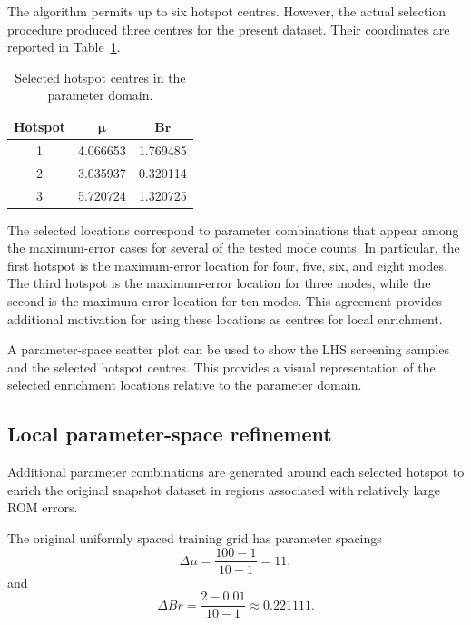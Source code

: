 The algorithm permits up to six hotspot centres.
However, the actual selection procedure produced
three centres for the present dataset. Their
coordinates are reported in
Table~\ref{tab:selected_hotspots}.

\begin{table}[htbp]
    \centering
    \caption{Selected hotspot centres in the parameter domain.}
    \label{tab:selected_hotspots}
    \begin{tabular}{ccc}
        \toprule
        \textbf{Hotspot} &
        $\boldsymbol{\mu}$ &
        $\boldsymbol{Br}$ \\
        \midrule
        1 & 4.066653 & 1.769485 \\
        2 & 3.035937 & 0.320114 \\
        3 & 5.720724 & 1.320725 \\
        \bottomrule
    \end{tabular}
\end{table}

The selected locations correspond to parameter
combinations that appear among the maximum-error
cases for several of the tested mode counts. In
particular, the first hotspot is the maximum-error
location for four, five, six, and eight modes. The
third hotspot is the maximum-error location for
three modes, while the second is the maximum-error
location for ten modes. This agreement provides
additional motivation for using these locations
as centres for local enrichment.

A parameter-space scatter plot can be used to show
the LHS screening samples and the selected hotspot
centres. This provides a visual representation of
the selected enrichment locations relative to the
parameter domain.

\subsection{Local parameter-space refinement}

Additional parameter combinations are generated
around each selected hotspot to enrich the original
snapshot dataset in regions associated with
relatively large ROM errors.

The original uniformly spaced training grid has
parameter spacings
\begin{equation}
    \Delta\mu
    =
    \frac{100-1}{10-1}
    =11,
\end{equation}
and
\begin{equation}
    \Delta Br
    =
    \frac{2-0.01}{10-1}
    \approx0.221111.
\end{equation}

